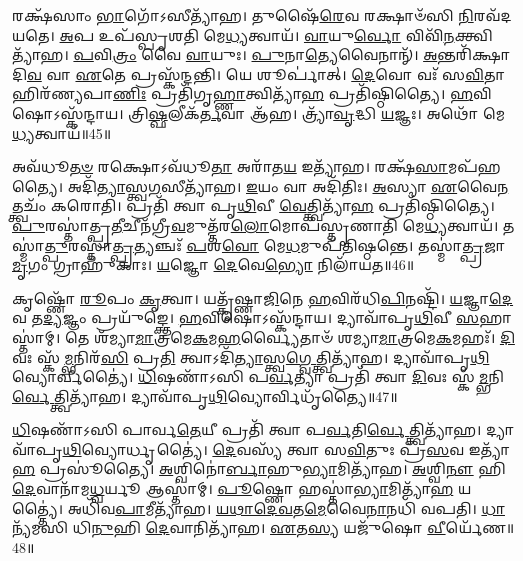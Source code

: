 𑌰𑌕𑍍𑌷᳴𑌸𑌾𑌂 \ul{𑌭𑌾}\-𑌗𑍋᳴\-𑌽𑌸𑍀𑌤𑍍𑌯𑌾᳴𑌹।
𑌤𑍁𑌷𑍈᳴\-\ul{𑌰𑍇}\-𑌵 𑌰𑌕𑍍𑌷𑌾𑍞᳴𑌸𑌿 \ul{𑌨𑌿}\-𑌰𑌵᳴𑌦𑌯𑌤𑍇।
\-\ul{𑌅}\-𑌪 𑌉𑌪᳴𑌸𑍍𑌪𑍃𑌶𑌤𑌿 𑌮𑍇\-\ul{𑌧𑍍𑌯}\-𑌤𑍍𑌵𑌾𑌯᳴।
\-\ul{𑌵𑌾}\-𑌯𑍁\-\ul{𑌰𑍍𑌵𑍋} 𑌵𑌿𑌵𑌿᳴\-\ul{𑌨}\-𑌕𑍍𑌤𑍍𑌵𑌿𑌤𑍍𑌯𑌾᳴𑌹।
\-\ul{𑌪}\-𑌵𑌿\-\ul{𑌤𑍍𑌰𑌂} 𑌵𑍈 \ul{𑌵𑌾}\-𑌯𑍁𑌃।
\-\ul{𑌪𑍁}\-𑌨𑌾\-\ul{𑌤𑍍𑌯𑍇}\-𑌵𑍈𑌨𑌾𑌨𑍍᳴।
\-\ul{𑌅}\-𑌨𑍍𑌤𑌰𑌿᳴𑌕𑍍𑌷𑌾𑌦𑌿\-\ul{𑌵} 𑌵𑌾 \ul{𑌏}\-𑌤𑍇 𑌪𑍍𑌰𑌸𑍍𑌕᳴𑌨𑍍𑌦𑌨𑍍𑌤𑌿।
𑌯𑍇 𑌶𑍂𑌰𑍍𑌪𑌾॑𑌤𑍍।
\-\ul{𑌦𑍇}\-𑌵𑍋 𑌵𑌃᳴ 𑌸\-\ul{𑌵𑌿}\-𑌤𑌾 𑌹𑌿𑌰᳴𑌣𑍍𑌯𑌪𑌾\-\ul{𑌣𑌿𑌃} 𑌪𑍍𑌰𑌤𑌿᳴\-𑌗𑍃\-\ul{𑌹𑍍𑌣𑌾}\-𑌤𑍍𑌵𑌿𑌤𑍍𑌯𑌾᳴\-\ul{𑌹} 𑌪𑍍𑌰𑌤𑌿᳴\-𑌷𑍍𑌠𑌿𑌤𑍍𑌯𑍈।
\-\ul{𑌹}\-𑌵𑌿𑌷𑍋\-𑌽𑌸𑍍𑌕᳴𑌨𑍍𑌦𑌾𑌯।
𑌤𑍍𑌰𑌿\-\ul{𑌷𑍍𑌫}\-𑌲𑍀𑌕᳴\-\ul{𑌰𑍍𑌤}\-𑌵𑌾 𑌆᳴𑌹।
𑌤𑍍𑌰𑍍𑌯𑌾᳴\-\ul{𑌵𑍃}\-𑌦𑍍𑌧𑌿 \ul{𑌯}\-𑌜𑍍𑌞𑌃।
𑌅𑌥𑍋᳴ 𑌮𑍇\-\ul{𑌧𑍍𑌯}\-𑌤𑍍𑌵𑌾𑌯᳴॥45॥\anuvakamend[𑌦𑍍𑌵𑌾\-\ul{𑌭𑍍𑌯𑌾}\-𑌮𑍁𑌤𑍍𑌪𑍁᳴𑌨𑌾𑌤𑌿 \ul{𑌰}\-𑌶𑍍𑌮𑌯𑍋᳴ 𑌨\-\ul{𑌯}\-𑌨𑍍𑌤𑍍𑌯𑌗𑍍𑌰𑍇᳴ \ul{𑌯}\-𑌜𑍍𑌞𑌪᳴𑌤𑌿𑌂 \ul{𑌯}\-𑌜𑍍𑌞𑍋\-𑌽𑌦𑌿᳴\-\ul{𑌤𑌿}\-𑌰𑌸𑍍𑌕᳴𑌨𑍍𑌦𑌾𑌯 𑌗𑍃\-\ul{𑌹𑍍𑌣𑌾}\-𑌮𑍀𑌤𑍍𑌯𑌾᳴𑌹 \ul{𑌵}\-𑌦𑍇𑌤𑍍𑌯𑌾᳴\-\ul{𑌹} 𑌵𑌿𑌜𑌿᳴\-\ul{𑌤𑍍𑌯𑌾} 𑌅𑌪᳴𑌹\-\ul{𑌤𑍍𑌯𑌾} 𑌅𑌸𑍍𑌕᳴𑌨𑍍𑌦𑌾\-\ul{𑌯} 𑌤𑍍𑌰𑍀𑌣𑌿᳴ 𑌚]

𑌅𑌵᳴𑌧𑍂\-\ul{𑌤}\-\-\ul{𑍞} 𑌰𑌕𑍍𑌷𑍋\-𑌽𑌵᳴𑌧𑍂\-\ul{𑌤𑌾} 𑌅𑌰𑌾᳴𑌤\-\ul{𑌯} 𑌇𑌤𑍍𑌯𑌾᳴𑌹।
𑌰𑌕𑍍𑌷᳴\-\ul{𑌸𑌾}\-𑌮𑌪᳴𑌹𑌤𑍍𑌯𑍈।
𑌅𑌦𑌿᳴\-\ul{𑌤𑍍𑌯𑌾}\-𑌸𑍍𑌤𑍍𑌵\-\ul{𑌗}\-𑌸𑍀𑌤𑍍𑌯𑌾᳴𑌹।
\-\ul{𑌇}\-𑌯𑌂 𑌵𑌾 𑌅𑌦𑌿᳴𑌤𑌿𑌃।
\-\ul{𑌅}\-𑌸𑍍𑌯𑌾 \ul{𑌏}\-𑌵𑍈\-\ul{𑌨}\-𑌤𑍍𑌤𑍍𑌵𑌚𑌂᳴ 𑌕𑌰𑍋𑌤𑌿।
𑌪𑍍𑌰𑌤𑌿᳴ 𑌤𑍍𑌵𑌾 𑌪𑍃\-\ul{𑌥𑌿}\-𑌵𑍀 \ul{𑌵𑍇}\-𑌤𑍍𑌤𑍍𑌵𑌿𑌤𑍍𑌯𑌾᳴\-\ul{𑌹} 𑌪𑍍𑌰𑌤𑌿᳴\-𑌷𑍍𑌠𑌿𑌤𑍍𑌯𑍈।
\-\ul{𑌪𑍁}\-𑌰𑌸𑍍𑌤𑌾॑𑌤𑍍𑌪𑍍𑌰\-\ul{𑌤𑍀}\-𑌚𑍀𑌨᳴\-𑌗𑍍𑌰𑍀\-\ul{𑌵}\-𑌮𑍁𑌤𑍍𑌤᳴𑌰\-\-\ul{𑌲𑍋}\-𑌮𑍋𑌪᳴𑌸𑍍𑌤𑍃𑌣𑌾𑌤𑌿 𑌮𑍇\-\ul{𑌧𑍍𑌯}\-𑌤𑍍𑌵𑌾𑌯᳴।
𑌤𑌸𑍍𑌮𑌾॑\-\ul{𑌤𑍍𑌪𑍁}\-𑌰𑌸𑍍𑌤𑌾॑\-\ul{𑌤𑍍𑌪𑍍𑌰}\-𑌤𑍍𑌯𑌞𑍍𑌚𑌃᳴ \ul{𑌪}\-𑌶\-\ul{𑌵𑍋} 𑌮𑍇\-\ul{𑌧}\-𑌮𑍁𑌪᳴𑌤𑌿𑌷𑍍𑌠𑌨𑍍𑌤𑍇।
𑌤𑌸𑍍𑌮𑌾॑\-\ul{𑌤𑍍𑌪𑍍𑌰}\-𑌜𑌾 \ul{𑌮𑍃}\-𑌗𑌂 𑌗𑍍𑌰𑌾𑌹𑍁᳴𑌕𑌾𑌃।
\-\ul{𑌯}\-𑌜𑍍𑌞𑍋 \ul{𑌦𑍇}\-𑌵𑍇\-\ul{𑌭𑍍𑌯𑍋} 𑌨𑌿𑌲𑌾᳴𑌯𑌤॥46॥

𑌕𑍃𑌷𑍍𑌣𑍋᳴ \ul{𑌰𑍂}\-𑌪𑌂 \ul{𑌕𑍃}\-𑌤𑍍𑌵𑌾।
𑌯𑌤𑍍𑌕𑍃᳴𑌷𑍍𑌣𑌾\-\ul{𑌜𑌿}\-𑌨𑍇 \ul{𑌹}\-𑌵𑌿𑌰᳴𑌧𑌿\-\ul{𑌪𑌿}\-𑌨𑌷𑍍𑌟𑌿᳴।
\-\ul{𑌯}\-𑌜𑍍𑌞𑌾\-\ul{𑌦𑍇}\-𑌵 𑌤\-\ul{𑌦𑍍𑌯}\-𑌜𑍍𑌞𑌂 𑌪𑍍𑌰𑌯𑍁᳴𑌙𑍍𑌕𑍍𑌤𑍇।
\-\ul{𑌹}\-𑌵𑌿𑌷𑍋\-𑌽𑌸𑍍𑌕᳴𑌨𑍍𑌦𑌾𑌯।
𑌦𑍍𑌯𑌾𑌵𑌾᳴𑌪𑍃\-\ul{𑌥𑌿}\-𑌵𑍀 \ul{𑌸}\-𑌹𑌾𑌸𑍍𑌤𑌾॑𑌮𑍍।
𑌤𑍇 𑌶᳴𑌮𑍍𑌯𑌾\-\ul{𑌮𑌾}\-𑌤𑍍𑌰𑌮𑍇\-\ul{𑌕}\-𑌮\-\ul{𑌹}\-𑌰𑍍𑌵𑍍𑌯𑍈𑌤𑌾𑍞᳴ 𑌶𑌮𑍍𑌯𑌾\-\ul{𑌮𑌾}\-𑌤𑍍𑌰𑌮𑍇\-\ul{𑌕}\-𑌮𑌹𑌃᳴।
\-\ul{𑌦𑌿}\-𑌵𑌃 𑌸𑍍𑌕᳴\-\ul{𑌮𑍍𑌭}\-𑌨𑌿𑌰᳴\-\ul{𑌸𑌿} 𑌪𑍍𑌰\-\ul{𑌤𑌿} 𑌤𑍍𑌵𑌾\-𑌽𑌦𑌿᳴\-\ul{𑌤𑍍𑌯𑌾}\-𑌸𑍍𑌤𑍍𑌵\-\ul{𑌗𑍍𑌵𑍇}\-𑌤𑍍𑌤𑍍𑌵𑌿𑌤𑍍𑌯𑌾᳴𑌹।
𑌦𑍍𑌯𑌾𑌵𑌾᳴𑌪𑍃\-\ul{𑌥𑌿}\-𑌵𑍍𑌯𑍋𑌰𑍍𑌵𑍀𑌤𑍍𑌯𑍈॑।
\-\ul{𑌧𑌿}\-𑌷𑌣𑌾᳴𑌽𑌸𑌿 𑌪\-\ul{𑌰𑍍𑌵}\-𑌤𑍍𑌯𑌾 𑌪𑍍𑌰𑌤𑌿᳴ 𑌤𑍍𑌵𑌾 \ul{𑌦𑌿}\-𑌵𑌃 𑌸𑍍𑌕᳴\-\ul{𑌮𑍍𑌭}\-𑌨𑌿\-\ul{𑌰𑍍𑌵𑍇}\-𑌤𑍍𑌤𑍍𑌵𑌿𑌤𑍍𑌯𑌾᳴𑌹।
𑌦𑍍𑌯𑌾𑌵𑌾᳴𑌪𑍃\-\ul{𑌥𑌿}\-𑌵𑍍𑌯𑍋𑌰𑍍𑌵𑌿𑌧𑍃᳴𑌤𑍍𑌯𑍈॥47॥

\-\ul{𑌧𑌿}\-𑌷𑌣𑌾᳴𑌽𑌸𑌿 𑌪𑌾𑌰𑍍𑌵\-\ul{𑌤𑍇}\-𑌯𑍀 𑌪𑍍𑌰𑌤𑌿᳴ 𑌤𑍍𑌵𑌾 𑌪\-\ul{𑌰𑍍𑌵}\-𑌤𑌿\-\ul{𑌰𑍍𑌵𑍇}\-𑌤𑍍𑌤𑍍𑌵𑌿𑌤𑍍𑌯𑌾᳴𑌹।
𑌦𑍍𑌯𑌾𑌵𑌾᳴𑌪𑍃\-\ul{𑌥𑌿}\-𑌵𑍍𑌯𑍋𑌰𑍍𑌧𑍃𑌤𑍍𑌯𑍈॑।
\-\ul{𑌦𑍇}\-𑌵𑌸𑍍𑌯᳴ 𑌤𑍍𑌵𑌾 𑌸\-\ul{𑌵𑌿}\-𑌤𑍁𑌃 𑌪𑍍𑌰᳴\-\ul{𑌸}\-𑌵 𑌇𑌤𑍍𑌯𑌾᳴\-\ul{𑌹} 𑌪𑍍𑌰𑌸𑍂॑𑌤𑍍𑌯𑍈।
\-\ul{𑌅}\-𑌶𑍍𑌵𑌿𑌨𑍋॑\-\ul{𑌰𑍍𑌬𑌾}\-𑌹𑍁\-\ul{𑌭𑍍𑌯𑌾}\-𑌮𑌿𑌤𑍍𑌯𑌾᳴𑌹।
\-\ul{𑌅}\-𑌶𑍍𑌵𑌿\-\ul{𑌨𑍗} 𑌹𑌿 \ul{𑌦𑍇}\-𑌵𑌾𑌨𑌾᳴𑌮\-\ul{𑌧𑍍𑌵}\-𑌰𑍍𑌯𑍂 𑌆𑌸𑍍𑌤𑌾॑𑌮𑍍।
\-\ul{𑌪𑍂}\-𑌷𑍍𑌣𑍋 𑌹𑌸𑍍𑌤𑌾॑\-\ul{𑌭𑍍𑌯𑌾}\-𑌮𑌿𑌤𑍍𑌯𑌾᳴\-\ul{𑌹} 𑌯𑌤𑍍𑌤𑍍𑌯𑍈॑।
𑌅𑌧𑌿᳴𑌵\-\ul{𑌪𑌾}\-𑌮𑍀𑌤𑍍𑌯𑌾᳴𑌹।
\-\ul{𑌯}\-\-\ul{𑌥𑌾}\-\-\ul{𑌦𑍇}\-\-\ul{𑌵}\-𑌤\-\ul{𑌮𑍇}\-𑌵𑍈\-\ul{𑌨𑌾}\-𑌨𑌧𑌿᳴ 𑌵𑌪𑌤𑌿।
\-\ul{𑌧𑌾}\-𑌨𑍍𑌯᳴𑌮𑌸𑌿 𑌧𑌿\-\ul{𑌨𑍁}\-𑌹𑌿 \ul{𑌦𑍇}\-𑌵𑌾𑌨𑌿𑌤𑍍𑌯𑌾᳴𑌹।
\-\ul{𑌏}\-𑌤\-\ul{𑌸𑍍𑌯} 𑌯𑌜𑍁᳴𑌷𑍋 \ul{𑌵𑍀}\-𑌰𑍍𑌯𑍇᳴𑌣॥48॥

